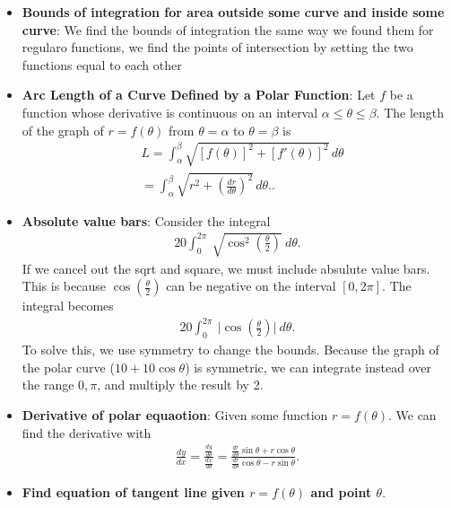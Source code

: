 \documentclass{report}
\begin{document}
\begin{itemize}
        \item \textbf{Bounds of integration for area outside some curve and inside some curve}: We find the bounds of integration the same way we found them for regularo functions, we find the points of intersection by setting the two functions equal to each other
        \item \textbf{Arc Length of a Curve Defined by a Polar Function}:
            Let \( f \) be a function whose derivative is continuous on an interval \( \alpha \leq \theta \leq \beta \). The length of the graph of \( r = f(\theta) \) from \( \theta = \alpha \) to \( \theta = \beta \) is
            \begin{align*}
              &L = \int_{\alpha}^{\beta} \sqrt{[f(\theta)]^2 + [f'(\theta)]^2} \, d\theta \\
              &= \int_{\alpha}^{\beta} \sqrt{r^2 + \left(\frac{dr}{d\theta}\right)^2} \, d\theta. 
          .\end{align*}
        \item \textbf{Absolute value bars}: Consider the integral
            \begin{align*}
                20 \int_{0}^{2\pi}\ \sqrt{\cos^{2}{\left(\frac{\theta }{2}\right)}}\ d\theta 
            .\end{align*}
            If we cancel out the sqrt and square, we must include absulute value bars. This is because $\cos{\left(\frac{\theta }{2}\right)}$ can be negative on the interval $[0,2\pi]$. The integral becomes
            \begin{align*}
                20 \int_{0}^{2\pi}\ \bigg\lvert \cos{\left(\frac{\theta}{2}\right)} \bigg\rvert\ d\theta 
            .\end{align*}
            To solve this, we use symmetry to change the bounds. Because the graph of the polar curve ($10+10\cos{\theta}$) is symmetric, we can integrate instead over the range $0,\pi$, and multiply the result by 2.
        \item \textbf{Derivative of polar equaotion}: Given some function $r=f(\theta )$. We can find the derivative with
            \begin{align*}
                \frac{dy}{dx} = \frac{\frac{dy}{d\theta}}{\frac{dx}{d\theta}} = \frac{\frac{dr}{d\theta }\sin{\theta } + r\cos{\theta }}{\frac{dr}{d\theta }\cos{\theta } - r\sin{\theta}}
            .\end{align*}
        \item \textbf{Find equation of tangent line given $r = f(\theta )$ and point $\theta$}. 

\end{itemize}
\end{document}
